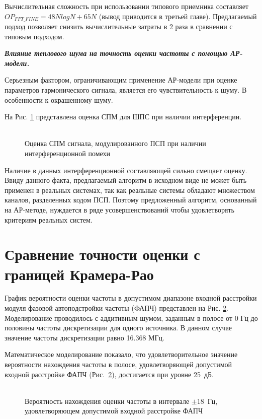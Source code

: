 Вычислительная сложность при использовании типового приемника составляет ${OP_{FFT\_FINE} = 48NlogN + 65N}$
(вывод приводится в третьей главе). Предлагаемый подход позволяет снизить вычислительные затраты в 2 раза в сравнении с типовым подходом.

{\bf{\textit{Влияние теплового шума на точность оценки частоты с помощью АР-модели.}}}

Серьезным фактором, ограничивающим применение АР-модели при оценке параметров гармонического сигнала, является
его чувствительность к шуму. В особенности к окрашенному шуму.

На Рис. \ref{pic:lpc_psd_2} представлена оценка СПМ для ШПС при наличии интерференции.
\begin{figure}[h]
	\center{}
	\caption{\\Оценка СПМ сигнала, модулированного ПСП при наличии интерференционной помехи}
	\label{pic:lpc_psd_2}
\end{figure}

Наличие в данных интерференционной составляющей сильно смещает оценку. Ввиду данного факта, предлагаемый алгоритм в исходном виде
не может быть применен в реальных системах, так как реальные системы обладают множеством каналов, разделенных кодом ПСП. Поэтому предложенный алгоритм,
основанный на \mbox{АР-методе}, нуждается в ряде усовершенствований чтобы удовлетворять критериям реальных систем.

\section{Сравнение точности оценки с границей Крамера-Рао}
График вероятности оценки частоты в допустимом диапазоне входной расстройки модуля фазовой автоподстройки частоты (ФАПЧ) представлен на Рис.
\ref{pic:lpc_for_1_probability}. Моделирование проводилось с аддитивным шумом, заданным в полосе от 0 Гц до
половины частоты дискретизации для одного источника. В данном случае значение частоты дискретизации равно 16.368 МГц.

Математическое моделирование показало, что удовлетворительное значение вероятности нахождения частоты в полосе, удовлетворяющей допустимой
входной расстройке ФАПЧ \mbox{(Рис. \ref{pic:lpc_for_1_probability})}, достигается при уровне \mbox{25 дБ}.

\begin{figure}[H]
\center{}
	\caption{\\Вероятность нахождения оценки частоты в интервале \mbox{${\pm 18}$ Гц,} удовлетворяющем допустимой входной расстройке ФАПЧ}
	\label{pic:lpc_for_1_probability}
\end{figure}

